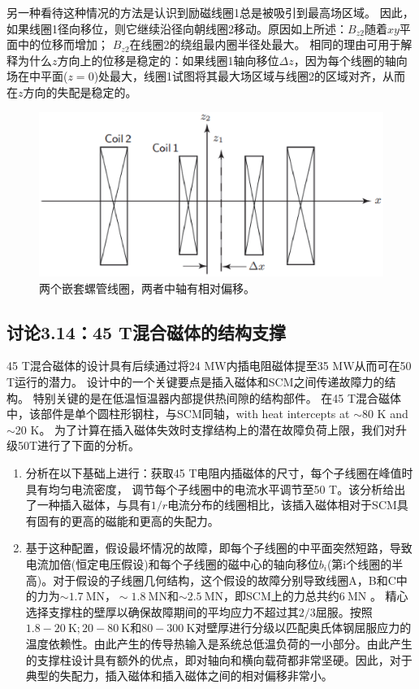 另一种看待这种情况的方法是认识到励磁线圈1总是被吸引到最高场区域。
因此，如果线圈1径向移位，则它继续沿径向朝线圈2移动。原因如上所述：$B_{z2}$随着$xy$平面中的位移而增加； $B_{z2}$在线圈2的绕组最内圈半径处最大。
相同的理由可用于解释为什么$z$方向上的位移是稳定的：如果线圈1轴向移位$\Delta z$，因为每个线圈的轴向场在中平面($z = 0$)处最大，线圈1试图将其最大场区域与线圈2的区域对齐，从而在$z$方向的失配是稳定的。
\begin{figure}[htbp]
	\centering
	\includegraphics[scale=0.6]{chpt3/figs/fig3.47.eps}
	\caption{两个嵌套螺管线圈，两者中轴有相对偏移。}
\end{figure}


\subsection{讨论3.14：45 T混合磁体的结构支撑}
45 T混合磁体的设计具有后续通过将24 MW内插电阻磁体提至35 MW从而可在50 T运行的潜力。
设计中的一个关键要点是插入磁体和SCM之间传递故障力的结构。
特别关键的是在低温恒温器内部提供热间隙的结构部件。
在45 T混合磁体中，该部件是单个圆柱形钢柱，与SCM同轴，with heat intercepts at $\sim$80 K and $\sim$20 K。
为了计算在插入磁体失效时支撑结构上的潜在故障负荷上限，我们对升级50T进行了下面的分析。
\begin{enumerate}
	\item 分析在以下基础上进行：获取45 T电阻内插磁体的尺寸，每个子线圈在峰值时具有均匀电流密度，
	调节每个子线圈中的电流水平调节至50 T。该分析给出了一种插入磁体，与具有$1 / r$电流分布的线圈相比，该插入磁体相对于SCM具有固有的更高的磁能和更高的失配力。
	
	\item 基于这种配置，假设最坏情况的故障，即每个子线圈的中平面突然短路，导致电流加倍(恒定电压假设)和每个子线圈的磁中心的轴向移位$b_i$(第i个线圈的半高)。对于假设的子线圈几何结构，这个假设的故障分别导致线圈A，B和C中的力为$\sim 1.7\ \mathrm{MN} ，\sim 1.8\ \mathrm{MN}$和$\sim 2.5\ \mathrm{MN}$，即SCM上的力总共约$6\ \mathrm{MN}$ 。
	精心选择支撑柱的壁厚以确保故障期间的平均应力不超过其$2/3$屈服。按照$1.8-20\ \mathrm{K};20-80\ \mathrm{K}$和$80-300 \ \mathrm{K}$对壁厚进行分级以匹配奥氏体钢屈服应力的温度依赖性。由此产生的传导热输入是系统总低温负荷的一小部分。由此产生的支撑柱设计具有额外的优点，即对轴向和横向载荷都非常坚硬。因此，对于典型的失配力，插入磁体和插入磁体之间的相对偏移非常小。
\end{enumerate}



